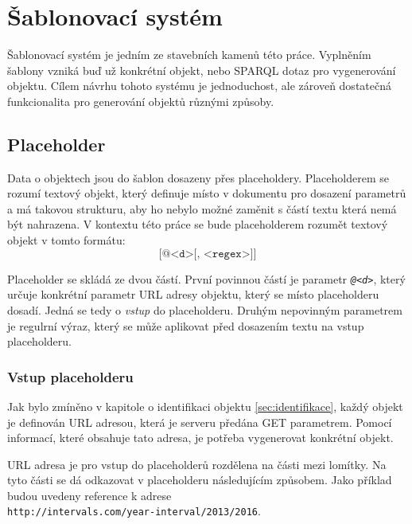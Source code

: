 \documentclass[thesis=B,czech]{FITthesis}[2012/06/26]
\begin{document}
 \section{Šablonovací systém}\label{template_system}
 Šablonovací systém je jedním ze stavebních kamenů této práce. Vyplněním šablony vzniká buď už konkrétní objekt, nebo SPARQL dotaz pro vygenerování objektu.
 Cílem návrhu tohoto systému je jednoduchost, ale zároveň dostatečná funkcionalita pro generování objektů různými způsoby.
 
 \subsection{Placeholder}
 Data o objektech jsou do šablon dosazeny přes placeholdery. Placeholderem se rozumí textový objekt, který definuje místo v dokumentu pro dosazení parametrů
 a má takovou strukturu, aby ho nebylo možné zaměnit s částí textu která nemá být nahrazena. V kontextu této práce se bude placeholderem rozumět textový objekt
 v tomto formátu:
 \begin{equation} \label{eq:placeholder}
 \texttt{[@<d>[, <regex>]]}
 \end{equation}
 
 Placeholder se skládá ze dvou částí. První povinnou částí je parametr \textit{\texttt{@<d>}}, který určuje konkrétní parametr URL adresy objektu,
 který se místo placeholderu dosadí. Jedná se tedy o \textit{vstup} do placeholderu.
 Druhým nepovinným parametrem je regulrní výraz, který se může aplikovat před dosazením textu na vstup placeholderu.
 
 \subsubsection{Vstup placeholderu}\label{placeholder_input}
 Jak bylo zmíněno v kapitole o identifikaci objektu \ref{sec:identifikace}, každý objekt je definován URL adresou, která je serveru předána GET parametrem.
 Pomocí informací, které obsahuje tato adresa, je potřeba vygenerovat konkrétní objekt.
 
 URL adresa je pro vstup do placeholderů rozdělena na části mezi lomítky. Na tyto části se dá odkazovat v placeholderu následujícím způsobem. Jako příklad 
 budou uvedeny reference k adrese\\ \texttt{http://intervals.com/year-interval/2013/2016}.
  
\end{document}
